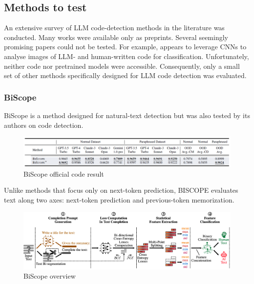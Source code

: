\clearpage
\subsection{Methods to test}
An extensive survey of LLM code-detection methods 
in the literature was conducted. Many works were available 
only as preprints. Several seemingly promising papers could 
not be tested. For example, \cite{xu2025codevision} appears 
to leverage CNNs to analyse images of LLM- and human-written 
code for classification. Unfortunately, neither code nor 
pretrained models were accessible. Consequently, only a small 
set of other methods specifically designed for LLM code detection 
was evaluated.








\subsubsection{BiScope}
BiScope is a method designed for natural-text detection 
but was also tested by its authors on code detection.

\begin{figure}[H]
    \centering
    \includegraphics[width=1\textwidth]{img/BiScope/codetest.png}
    \caption{BiScope official code result}
    \label{fig:BiScope official code result}
\end{figure}


Unlike methods that focus only on next-token prediction, 
BISCOPE evaluates text along two axes: next-token prediction 
and previous-token memorization.

\begin{figure}[H]
    \centering
    \includegraphics[width=1\textwidth]{img/BiScope/Overview.png}
    \caption{BiScope overview}
    \label{fig:BiScope-overview}
\end{figure}

